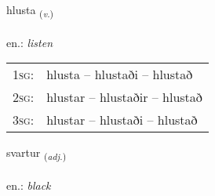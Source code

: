 \documentclass[frontgrid, backgrid]{flacards}\usepackage[]{graphicx}\usepackage[]{xcolor}
\begin{document}
\renewcommand{\flhead}{\vskip5pt \fboxsep=0pt {\small\bfseries\footnotesize Sagnorð | Verb}}
\renewcommand{\fcfoot}{\vskip5pt \fboxsep=0pt \hspace{2pt}{\small\bfseries\footnotesize 1K}}

\renewcommand{\blhead}{\vskip5pt {\small\bfseries\footnotesize Sagnorð | Verb }}
\renewcommand{\bcfoot}{\vskip5pt \hspace{2pt}{\small\bfseries\footnotesize 1K}}


{hlusta \small{\textsubscript{(\textit{v.})}} \\[1ex] %
\textphonetic{[l̥ʏsta]} \\
en.: \emph{listen} \\  [2ex]
\renewcommand*{\arraystretch}{0.8}
\begin{tabular}{p{1cm}l}
\textsc{1sg}: & hlusta -- hlustaði -- hlustað \\ 
\textsc{2sg}: & hlustar -- hlustaðir -- hlustað \\ 
\textsc{3sg}: & hlustar -- hlustaði -- hlustað \\ 
\end{tabular}
}

\renewcommand{\flhead}{\vskip5pt \fboxsep=0pt {\small\bfseries\footnotesize Lýsingarorð | Adjective}}
\renewcommand{\fcfoot}{\vskip5pt \fboxsep=0pt \hspace{2pt}{\small\bfseries\footnotesize 1K}}

\renewcommand{\blhead}{\vskip5pt {\small\bfseries\footnotesize Lýsingarorð | Adjective }}
\renewcommand{\bcfoot}{\vskip5pt \hspace{2pt}{\small\bfseries\footnotesize 1K}}


{svartur \small{\textsubscript{(\textit{adj.})}} \\[1ex] %
 \\
en.: \emph{black} \\  [2ex]
\renewcommand*{\arraystretch}{0.8}
}
\end{document}
